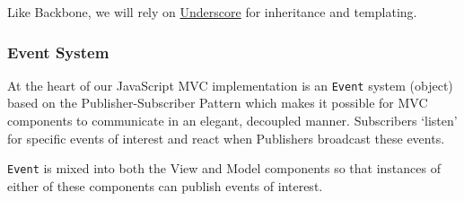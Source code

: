 \documentclass[9pt]{book}
\begin{document}
Like Backbone, we will rely on
\href{http://underscorejs.org}{Underscore} for inheritance and
templating.

\subsubsection{Event System}\label{event-system}

At the heart of our JavaScript MVC implementation is an \texttt{Event}
system (object) based on the Publisher-Subscriber Pattern which makes it
possible for MVC components to communicate in an elegant, decoupled
manner. Subscribers `listen' for specific events of interest and react
when Publishers broadcast these events.

\texttt{Event} is mixed into both the View and Model components so that
instances of either of these components can publish events of interest.
\end{document}
